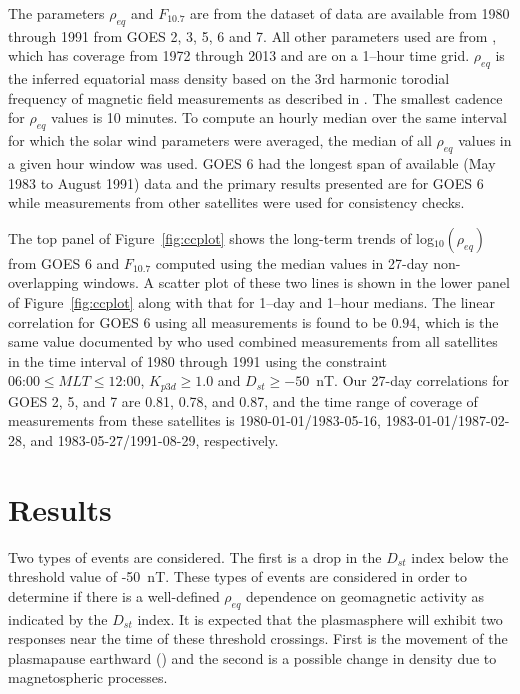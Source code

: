 \documentclass[draft,linenumbers]{agujournal}
\begin{document}
The parameters $\rho_{eq}$ and $F_{10.7}$ are from the dataset of \citet{Takahashi2010} data are available from 1980 through 1991 from GOES 2, 3, 5, 6 and 7.  All other parameters used are from \citet{Kondrashov2014ReconstructionOfGaps}, which has coverage from 1972 through 2013 and are on a 1--hour time grid. $\rho_{eq}$ is the inferred equatorial mass density based on the 3rd harmonic torodial frequency of magnetic field measurements as described in \citet{Takahashi2010}.  The smallest cadence for $\rho_{eq}$ values is 10 minutes.  To compute an hourly median over the same interval for which the solar wind parameters were averaged, the median of all $\rho_{eq}$ values in a given hour window was used. GOES 6 had the longest span of available (May 1983 to August 1991) data and the primary results presented are for GOES 6 while measurements from other satellites were used for consistency checks.


The top panel of Figure~\ref{fig:ccplot} shows the long-term trends of log$_{10}(\rho_{eq})$ from GOES 6 and $F_{10.7}$ computed using the median values in 27-day non-overlapping windows.  A scatter plot of these two lines is shown in the lower panel of Figure~\ref{fig:ccplot} along with that for 1--day and 1--hour medians.  The linear correlation for GOES 6 using all measurements is found to be $0.94$, which is the same value documented by \citet{Takahashi2010} who used combined measurements from all satellites in the time interval of 1980 through 1991 using the constraint $06\mbox{:}00 \leq MLT \le 12\mbox{:}00$, $K_{p3d}\ge1.0$ and $D_{st}\ge -50$~nT.  Our 27-day correlations for GOES 2, 5, and 7 are 0.81, 0.78, and 0.87, and the time range of coverage of measurements from these satellites is 1980-01-01/1983-05-16, 1983-01-01/1987-02-28, and 1983-05-27/1991-08-29, respectively.

\section{Results}

Two types of events are considered. The first is a drop in the $D_{st}$ index below the threshold value of -50~nT. These types of events are considered in order to determine if there is a well-defined $\rho_{eq}$ dependence on geomagnetic activity as indicated by the $D_{st}$ index.  It is expected that the plasmasphere will exhibit two responses near the time of these threshold crossings.  First is the movement of the plasmapause earthward (\citet{LemaireEarthsPlasmasphere}) and the second is a possible change in density due to magnetospheric processes. 
\end{document}
